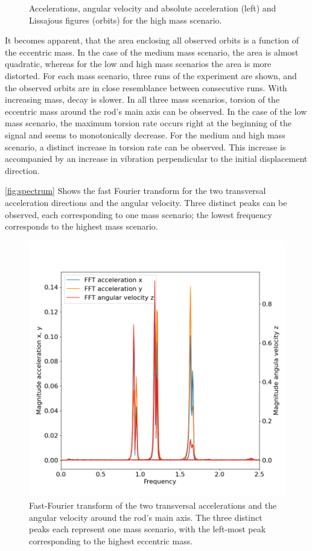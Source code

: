 \documentclass{article}
\begin{document}
\begin{figure}
\begin{subfigure}[b]{0.45\textwidth}
        \caption{}
        \label{fig:high-mass:orbit}
    \end{subfigure}
    
    
    \caption{Accelerations, angular velocity and absolute acceleration (left) and Lissajous figures (orbits) for the high mass scenario.}
    \label{fig:high-mass}
\end{figure}

It becomes apparent, that the area enclosing all observed orbits is a function of the eccentric mass. In the case of the medium mass scenario, the area is almost quadratic, whereas for the low and high mass scenarios the area is more distorted. For each mass scenario, three runs of the experiment are shown, and the observed orbits are in close resemblance between consecutive runs. With increasing mass, decay is slower. In all three mass scenarios, torsion of the eccentric mass around the rod's main axis can be observed. In the case of the low mass scenario, the maximum torsion rate occurs right at the beginning of the signal and seems to monotonically decrease. For the medium and high mass scenario, a distinct increase in torsion rate can be observed. This increase is accompanied by an increase in vibration perpendicular to the initial displacement direction.

\clearpage

\autoref{fig:spectrum} Shows the fast Fourier transform for the two transversal acceleration directions and the angular velocity. Three distinct peaks can be observed, each corresponding to one mass scenario; the lowest frequency corresponds to the highest mass scenario. 

\begin{figure}[ht]
    \centering
    \includegraphics[width=0.5\linewidth]{../results/experiment/spectrum.png}
    \caption{Fast-Fourier transform of the two transversal accelerations and the angular velocity around the rod's main axis. The three distinct peaks each represent one mass scenario, with the left-most peak corresponding to the highest eccentric mass.}
    \label{fig:spectrum}
\end{figure}
\end{document}

